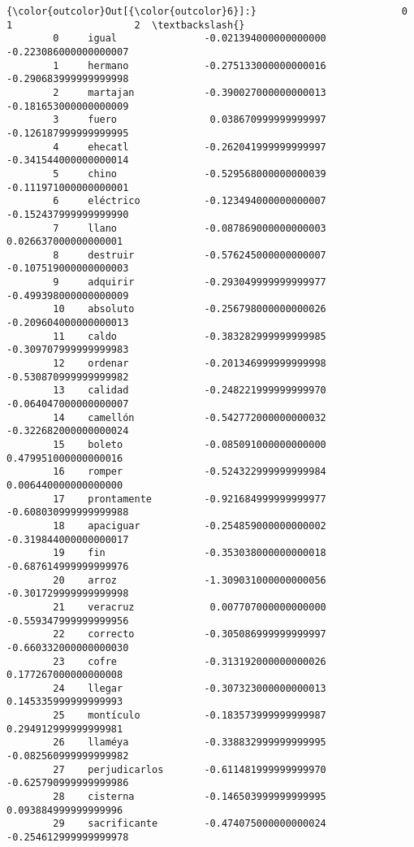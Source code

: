 \documentclass[11pt]{article}
\begin{document}
\begin{Verbatim}[commandchars=\\\{\}]
{\color{outcolor}Out[{\color{outcolor}6}]:}                         0                     1                     2  \textbackslash{}
        0     igual               -0.021394000000000000 -0.223086000000000007   
        1     hermano             -0.275133000000000016 -0.290683999999999998   
        2     martajan            -0.390027000000000013 -0.181653000000000009   
        3     fuero                0.038670999999999997 -0.126187999999999995   
        4     ehecatl             -0.262041999999999997 -0.341544000000000014   
        5     chino               -0.529568000000000039 -0.111971000000000001   
        6     eléctrico           -0.123494000000000007 -0.152437999999999990   
        7     llano               -0.087869000000000003  0.026637000000000001   
        8     destruir            -0.576245000000000007 -0.107519000000000003   
        9     adquirir            -0.293049999999999977 -0.499398000000000009   
        10    absoluto            -0.256798000000000026 -0.209604000000000013   
        11    caldo               -0.383282999999999985 -0.309707999999999983   
        12    ordenar             -0.201346999999999998 -0.530870999999999982   
        13    calidad             -0.248221999999999970 -0.064047000000000007   
        14    camellón            -0.542772000000000032 -0.322682000000000024   
        15    boleto              -0.085091000000000000  0.479951000000000016   
        16    romper              -0.524322999999999984  0.006440000000000000   
        17    prontamente         -0.921684999999999977 -0.608030999999999988   
        18    apaciguar           -0.254859000000000002 -0.319844000000000017   
        19    fin                 -0.353038000000000018 -0.687614999999999976   
        20    arroz               -1.309031000000000056 -0.301729999999999998   
        21    veracruz             0.007707000000000000 -0.559347999999999956   
        22    correcto            -0.305086999999999997 -0.660332000000000030   
        23    cofre               -0.313192000000000026  0.177267000000000008   
        24    llegar              -0.307323000000000013  0.145335999999999993   
        25    montículo           -0.183573999999999987  0.294912999999999981   
        26    llaméya             -0.338832999999999995 -0.082560999999999982   
        27    perjudicarlos       -0.611481999999999970 -0.625790999999999986   
        28    cisterna            -0.146503999999999995  0.093884999999999996   
        29    sacrificante        -0.474075000000000024 -0.254612999999999978   

\end{Verbatim}
\end{document}
